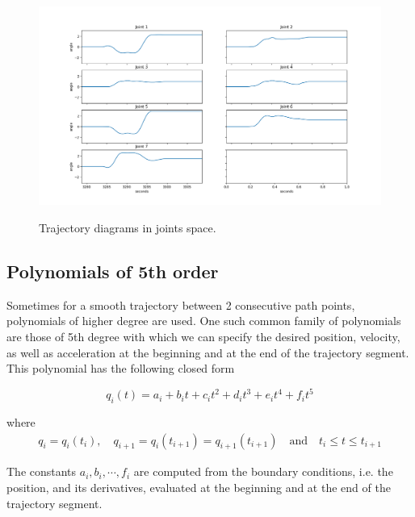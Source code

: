 \begin{center}
\begin{figure}[!htb]
\centering
\includegraphics[width=\textwidth]{images/trajectory1-test1.png}\\
\caption{Trajectory diagrams in joints space.}
\end{figure}
\end{center}


\subsection{Polynomials of 5th order}
\label{section-polynomials-5}

Sometimes for a smooth trajectory between 2 consecutive path points, polynomials of higher degree are used. One such common family of polynomials are those of 5th degree with which we can specify the desired 
position, velocity, as well as acceleration at the beginning and at the end of the trajectory segment. This polynomial has the following closed form

\begin{equation}
q_i(t) = a_i + b_it + c_it^2 + d_it^3 + e_it^4 + f_it^5
\end{equation}

where
\begin{equation}
\begin{gathered}
q_i = q_i(t_i), \quad q_{i+1} = q_i(t_{i+1}) = q_{i+1}(t_{i+1}) \quad \textrm{and} \quad t_i \leq t \leq t_{i+1}
\end{gathered}
\end{equation}

The constants $a_i, b_i, \cdots, f_i$ are computed from the boundary conditions, i.e. the position, and its derivatives, evaluated at the beginning and at the end of the trajectory segment.

